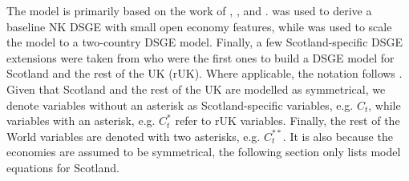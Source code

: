 The model is primarily based on the work of \textcite{jordigal_2015_monetary}, \textcite{gali_2005_monetary}, and \textcite{ricci_2019_essays}. \textcite{jordigal_2015_monetary} was used to derive a baseline NK DSGE with small open economy features, while \textcite{gali_2005_monetary} was used to scale the model to a two-country DSGE model. Finally, a few Scotland-specific DSGE extensions were taken from \textcite{ricci_2019_essays} who were the first ones to build a DSGE model for Scotland and the rest of the UK (rUK). Where applicable, the notation follows \textcite{jordigal_2015_monetary}. Given that Scotland and the rest of the UK are modelled as symmetrical, we denote variables without an asterisk as Scotland-specific variables, e.g. $C_t$, while variables with an asterisk, e.g. $C^*_t$ refer to rUK variables. Finally, the rest of the World variables are denoted with two asterisks, e.g. $C^{**}_t$. It is also because the economies are assumed to be symmetrical, the following section only lists model equations for Scotland.